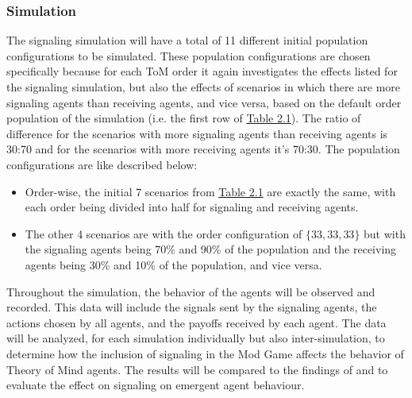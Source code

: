 \subsubsection{Simulation}

The signaling simulation will have a total of 11 different initial population configurations to be simulated. These population configurations are chosen specifically because for each ToM order it again investigates the effects listed for the signaling simulation, but also the effects of scenarios in which there are more signaling agents than receiving agents, and vice versa, based on the default order population of the simulation (i.e. the first row of \hyperref[tab:reg-population-table]{Table 2.1}). The ratio of difference for the scenarios with more signaling agents than receiving agents is 30:70 and for the scenarios with more receiving agents it's 70:30. The population configurations are like described below:

\begin{itemize}
    \item Order-wise, the initial 7 scenarios from \hyperref[tab:reg-population-table]{Table 2.1} are exactly the same, with each order being divided into half for signaling and receiving agents.
    \item The other 4 scenarios are with the order configuration of $\{33,33,33\}$ but with the signaling agents being 70\% and 90\% of the population and the receiving agents being 30\% and 10\% of the population, and vice versa.
\end{itemize}


Throughout the simulation, the behavior of the agents will be observed and recorded. This data will include the signals sent by the signaling agents, the actions chosen by all agents, and the payoffs received by each agent. The data will be analyzed, for each simulation individually but also inter-simulation, to determine how the inclusion of signaling in the Mod Game affects the behavior of Theory of Mind agents. The results will be compared to the findings of \cite{de2013much} and \cite{veltman2019training} to evaluate the effect on signaling on emergent agent behaviour.